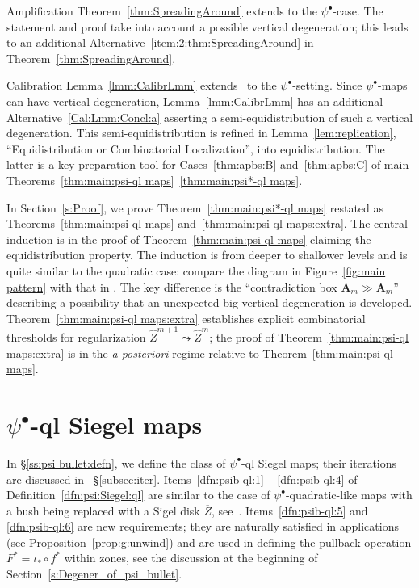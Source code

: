 \documentclass{amsart}
\newcommand{\1}{{\mathbb 1 }}
\newcommand{\bA}{{\mathbf{A}}}
\newcommand{\wZ}{{\widehat Z}}
\theoremstyle{remark}
\numberwithin{equation}{section}
\theoremstyle{definition}
\begin{document}
Amplification Theorem~\ref{thm:SpreadingAround} extends \cite[Theorem 8.1]{DL22} to the $\psi^\bullet$-case. The statement and proof take into account a possible vertical degeneration; this leads to an additional Alternative~\ref{item:2:thm:SpreadingAround} in Theorem~\ref{thm:SpreadingAround}.


Calibration Lemma~\ref{lmm:CalibrLmm} extends~\cite[Lemma 9.1]{DL22} to the $\psi^\bullet$-setting. Since $\psi^\bullet$-maps can have vertical degeneration, Lemma~\ref{lmm:CalibrLmm} has an additional Alternative~\ref{Cal:Lmm:Concl:a} asserting a semi-equidistribution of such a vertical degeneration. This semi-equidistribution is refined in Lemma~\ref{lem:replication}, ``Equidistribution or Combinatorial Localization'', into equidistribution. The latter is a key preparation tool for Cases~\ref{thm:apbs:B} and~\ref{thm:apbs:C} of main Theorems~\ref{thm:main:psi-ql maps}~\ref{thm:main:psi*-ql maps}.


In Section~\ref{s:Proof}, we prove Theorem~\ref{thm:main:psi*-ql maps} restated as Theorems~\ref{thm:main:psi-ql maps} and~\ref{thm:main:psi-ql maps:extra}. The central induction is in the proof of Theorem~\ref{thm:main:psi-ql maps} claiming the equidistribution property. The induction is from deeper to shallower levels and is quite similar to the quadratic case: compare the diagram in Figure~\ref{fig:main pattern} with that in \cite[Figure 27]{DL22}. The key difference is the ``contradiction box $\bA_m \gg \bA_m$'' describing a possibility that an unexpected big vertical degeneration is developed. Theorem~\ref{thm:main:psi-ql maps:extra} establishes explicit combinatorial thresholds for regularization $\wZ^{m+1}\leadsto \wZ^m$; the proof of Theorem~\ref{thm:main:psi-ql maps:extra} is in the \emph{a posteriori} regime relative to Theorem~\ref{thm:main:psi-ql maps}.


\section{$\psi^\bullet$-ql Siegel maps}
\label{s:Defn}
In \S\ref{ss:psi bullet:defn}, we define the class of $\psi^\bullet$-ql Siegel maps; their iterations are discussed in ~\S\ref{subsec:iter}. Items~\ref{dfn:psib-ql:1} -- \ref{dfn:psib-ql:4} of Definition~\ref{dfn:psi:Siegel:ql} are similar to the case of $\psi^\bullet$-quadratic-like maps with a bush being replaced with a Sigel disk $\overline Z$, see~\cite[\S~3.4.2]{DL:Feigen}. Items~\ref{dfn:psib-ql:5} and \ref{dfn:psib-ql:6} are new requirements; they are naturally satisfied in applications (see Proposition~\ref{prop:g:unwind}) and are used in defining the pullback operation $F^*=\iota_*\circ f^*$ within zones, see the discussion at the beginning of Section~\ref{s:Degener_of_psi_bullet}. 
\end{document}
